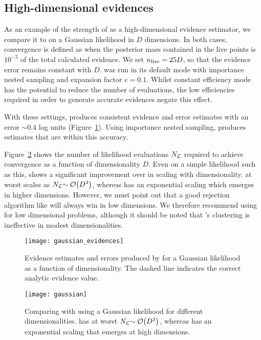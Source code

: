 \subsection{High-dimensional evidences}
\label{sec:pc:hi_ev}

As an example of the strength of \PolyChord{} as a high-dimensional evidence estimator, we compare it to \MultiNest{} on a Gaussian likelihood in $D$ dimensions.  In both cases, convergence is defined as when the posterior mass contained in the live points is $10^{-2}$ of the total calculated evidence.  We set $n_{\mathrm{live}}=25D$, so that the evidence error remains constant with $D$. \MultiNest{} was run in its default mode with importance nested sampling and expansion factor $e=0.1$.  Whilst constant efficiency mode has the potential to reduce the number of \MultiNest{} evaluations, the low efficiencies required in order to generate accurate evidences negate this effect.                                       


With these settings, \PolyChord{} produces consistent evidence and error estimates with an error $\sim0.4$ log units (Figure~\ref{fig:pc:gaussian_evidences}). Using importance nested sampling, \MultiNest{} produces estimates that are within this accuracy.

Figure~\ref{fig:pc:gaussian} shows the number of likelihood evaluations $N_{\mathcal{L}}$ required to achieve convergence as a function of dimensionality $D$. 
Even on a simple likelihood such as this, \PolyChord{} shows a significant improvement over \MultiNest{} in scaling with dimensionality.  \PolyChord{} at worst scales as ${N_{\mathcal{L}}{\sim\mathcal{O}{\left(D^3\right)}}}$, whereas \MultiNest{} has an exponential scaling which emerges in higher dimensions.
However, we must point out that a good rejection algorithm like \MultiNest{} will always win in low dimensions. We therefore recommend using \MultiNest{} for low dimensional problems, although it should be noted that \MultiNest{}'s clustering is ineffective in modest dimensionalities.

\begin{figure}
  \centering
  \texttt{[image: gaussian\_evidences]}
  \caption{%
    Evidence estimates and errors produced by \PolyChord{} for a Gaussian likelihood as a function of dimensionality. The dashed line indicates the correct analytic evidence value.\label{fig:pc:gaussian_evidences}
}
\end{figure}

\begin{figure}
  \centering
  \texttt{[image: gaussian]}
  \caption{Comparing \PolyChord{} with \MultiNest{} using a
  Gaussian likelihood for different dimensionalities. \PolyChord{} has at worst $N_{\mathcal{L}}{\sim\mathcal{O}{\left(D^3\right)}}$, whereas \MultiNest{} has an exponential scaling that emerges at high dimensions.\label{fig:pc:gaussian}
}
\end{figure}

